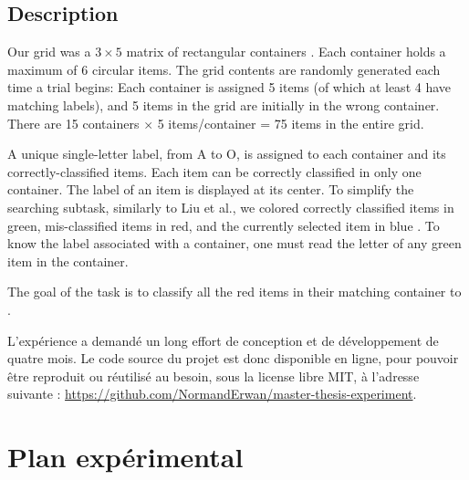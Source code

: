 \subsection{Description}


Our grid was a $3 \times 5$ matrix of rectangular containers . Each container holds a maximum of 6 circular items. The grid contents are randomly generated each time a trial begins: Each container is assigned 5 items (of which at least 4 have matching labels), and 5 items in the grid are initially in the wrong container. There are 15 containers $\times$ 5 items/container = 75 items in the entire grid.

A unique single-letter label, from A to O, is assigned to each container and its correctly-classified items. Each item can be correctly classified in only one container. The label of an item is displayed at its center. To simplify the searching subtask, similarly to Liu et al., we colored correctly classified items in green, mis-classified items in red, and the currently selected item in blue . To know the label associated with a container, one must read the letter of any green item in the container.

The goal of the task is to classify all the red items in their matching container to  \citep{Liu2014}.

L'expérience a demandé un long effort de conception et de développement de quatre mois. Le code source du projet est donc disponible en ligne, pour pouvoir être reproduit ou réutilisé au besoin, sous la license libre MIT, à l'adresse suivante : \url{https://github.com/NormandErwan/master-thesis-experiment}.


\section{Plan expérimental}
\label{sec:experiment_design}

